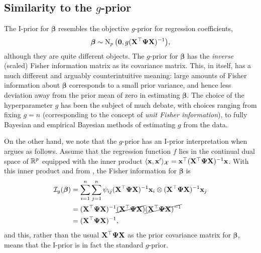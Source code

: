 \subsection{Similarity to the $g$-prior}
\label{misc:gprior}

The I-prior for $\boldsymbol{\beta}$ resembles the objective $g$-prior \citep{zellner1986assessing} for regression coefficients,
\[
  \boldsymbol{\beta} \sim \operatorname{N}_p\big({\mathbf 0}, g ({\mathbf X}^\top {\bm\Psi} {\mathbf X})^{-1} \big),
\]
although they are quite different objects. 
The $g$-prior for $\boldsymbol{\beta}$ has the \emph{inverse} (scaled) Fisher information matrix as its covariance matrix.
This, in itself, has a much different and arguably counterintuitive meaning: large amounts of Fisher information about $\boldsymbol{\beta}$ corresponds to a small prior variance, and hence less deviation away from the prior mean of zero in estimating $\boldsymbol\beta$.
The choice of the hyperparameter $g$ has been the subject of much debate, with choices ranging from fixing $g=n$ (corresponding to the concept of \emph{unit Fisher information}), to fully Bayesian and empirical Bayesian methods of estimating $g$ from the data.

On the other hand, we note that the $g$-prior has an I-prior interpretation when argues as follows.
Assume that the regression function $f$ lies in the continual dual space of $\mathbb{R}^p$ equipped with the inner product $\langle{\mathbf x},{\mathbf x}'\rangle_{\mathcal X} = {\mathbf x}^\top({\mathbf X}^\top {\bm\Psi} {\mathbf X})^{-1}{\mathbf x}$.
With this inner product and from , the Fisher information for $\boldsymbol{\beta}$ is
\begin{align*}
  {\mathcal I}_g(\boldsymbol\beta) 
  &= \sum_{i=1}^n \sum_{j=1}^n \psi_{ij} ({\mathbf X}^\top {\bm\Psi} {\mathbf X})^{-1}{\mathbf x}_i \otimes ({\mathbf X}^\top {\bm\Psi} {\mathbf X})^{-1}{\mathbf x}_j \\
  &= ({\mathbf X}^\top {\bm\Psi} {\mathbf X})^{-1} \cancel{({\mathbf X}^\top {\bm\Psi} {\mathbf X})} \cancel{({\mathbf X}^\top {\bm\Psi} {\mathbf X})^{-1}} \\
  &= ({\mathbf X}^\top {\bm\Psi} {\mathbf X})^{-1},
\end{align*}
and this, rather than the usual ${\mathbf X}^\top {\bm\Psi} {\mathbf X}$ as the prior covariance matrix for $\boldsymbol{\beta}$, means that the I-prior is in fact the standard $g$-prior.

